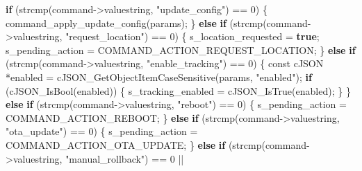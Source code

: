 \documentclass[a4paper]{extarticle}
\newenvironment{Shaded}{}{}
\newcommand{\ControlFlowTok}[1]{\textcolor[rgb]{0.00,0.44,0.13}{\textbf{#1}}}
\newcommand{\DataTypeTok}[1]{\textcolor[rgb]{0.56,0.13,0.00}{#1}}
\newcommand{\DecValTok}[1]{\textcolor[rgb]{0.25,0.63,0.44}{#1}}
\newcommand{\KeywordTok}[1]{\textcolor[rgb]{0.00,0.44,0.13}{\textbf{#1}}}
\newcommand{\NormalTok}[1]{#1}
\newcommand{\OperatorTok}[1]{\textcolor[rgb]{0.40,0.40,0.40}{#1}}
\newcommand{\StringTok}[1]{\textcolor[rgb]{0.25,0.44,0.63}{#1}}
\begin{document}
\begin{Shaded}
\begin{Highlighting}[]
    \ControlFlowTok{if} \OperatorTok{(}\NormalTok{strcmp}\OperatorTok{(}\NormalTok{command}\OperatorTok{{-}\textgreater{}}\NormalTok{valuestring}\OperatorTok{,} \StringTok{"update\_config"}\OperatorTok{)} \OperatorTok{==} \DecValTok{0}\OperatorTok{)} \OperatorTok{\{}
\NormalTok{        command\_apply\_update\_config}\OperatorTok{(}\NormalTok{params}\OperatorTok{);}
    \OperatorTok{\}} \ControlFlowTok{else} \ControlFlowTok{if} \OperatorTok{(}\NormalTok{strcmp}\OperatorTok{(}\NormalTok{command}\OperatorTok{{-}\textgreater{}}\NormalTok{valuestring}\OperatorTok{,} \StringTok{"request\_location"}\OperatorTok{)} \OperatorTok{==} \DecValTok{0}\OperatorTok{)} \OperatorTok{\{}
\NormalTok{        s\_location\_requested }\OperatorTok{=} \KeywordTok{true}\OperatorTok{;}
\NormalTok{        s\_pending\_action }\OperatorTok{=}\NormalTok{ COMMAND\_ACTION\_REQUEST\_LOCATION}\OperatorTok{;}
    \OperatorTok{\}} \ControlFlowTok{else} \ControlFlowTok{if} \OperatorTok{(}\NormalTok{strcmp}\OperatorTok{(}\NormalTok{command}\OperatorTok{{-}\textgreater{}}\NormalTok{valuestring}\OperatorTok{,} \StringTok{"enable\_tracking"}\OperatorTok{)} \OperatorTok{==} \DecValTok{0}\OperatorTok{)} \OperatorTok{\{}
        \DataTypeTok{const}\NormalTok{ cJSON }\OperatorTok{*}\NormalTok{enabled }\OperatorTok{=}\NormalTok{ cJSON\_GetObjectItemCaseSensitive}\OperatorTok{(}\NormalTok{params}\OperatorTok{,} \StringTok{"enabled"}\OperatorTok{);}
        \ControlFlowTok{if} \OperatorTok{(}\NormalTok{cJSON\_IsBool}\OperatorTok{(}\NormalTok{enabled}\OperatorTok{))} \OperatorTok{\{}
\NormalTok{            s\_tracking\_enabled }\OperatorTok{=}\NormalTok{ cJSON\_IsTrue}\OperatorTok{(}\NormalTok{enabled}\OperatorTok{);}
        \OperatorTok{\}}
    \OperatorTok{\}} \ControlFlowTok{else} \ControlFlowTok{if} \OperatorTok{(}\NormalTok{strcmp}\OperatorTok{(}\NormalTok{command}\OperatorTok{{-}\textgreater{}}\NormalTok{valuestring}\OperatorTok{,} \StringTok{"reboot"}\OperatorTok{)} \OperatorTok{==} \DecValTok{0}\OperatorTok{)} \OperatorTok{\{}
\NormalTok{        s\_pending\_action }\OperatorTok{=}\NormalTok{ COMMAND\_ACTION\_REBOOT}\OperatorTok{;}
    \OperatorTok{\}} \ControlFlowTok{else} \ControlFlowTok{if} \OperatorTok{(}\NormalTok{strcmp}\OperatorTok{(}\NormalTok{command}\OperatorTok{{-}\textgreater{}}\NormalTok{valuestring}\OperatorTok{,} \StringTok{"ota\_update"}\OperatorTok{)} \OperatorTok{==} \DecValTok{0}\OperatorTok{)} \OperatorTok{\{}
\NormalTok{        s\_pending\_action }\OperatorTok{=}\NormalTok{ COMMAND\_ACTION\_OTA\_UPDATE}\OperatorTok{;}
    \OperatorTok{\}} \ControlFlowTok{else} \ControlFlowTok{if} \OperatorTok{(}\NormalTok{strcmp}\OperatorTok{(}\NormalTok{command}\OperatorTok{{-}\textgreater{}}\NormalTok{valuestring}\OperatorTok{,} \StringTok{"manual\_rollback"}\OperatorTok{)} \OperatorTok{==} \DecValTok{0} \OperatorTok{||}

\end{Highlighting}
\end{Shaded}
\end{document}
